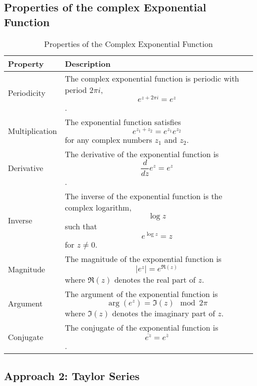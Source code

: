 \subsection*{Properties of the complex Exponential Function}
\begin{table}[htbp]
    \centering
    \begin{tabular}{| m{2.5cm} | m{11.5cm} |}
        \hline
        \textbf{Property} & \textbf{Description}                                                                                                                     \\
        \hline
        Periodicity       & The complex exponential function is periodic with period \( 2\pi i \), \[ e^{z + 2\pi i} = e^z \].                                       \\
        \hline
        Multiplication    & The exponential function satisfies \[ e^{z_1 + z_2} = e^{z_1} e^{z_2} \] for any complex numbers \( z_1 \) and \( z_2 \).                \\
        \hline
        Derivative        & The derivative of the exponential function is \[ \frac{d}{dz} e^z = e^z \].                                                              \\
        \hline
        Inverse           & The inverse of the exponential function is the complex logarithm, \[ \log z \] such that \[ e^{\log z} = z \] for \( z \neq 0 \).        \\
        \hline
        Magnitude         & The magnitude of the exponential function is \[ |e^z| = e^{\Re(z)} \] where \( \Re(z) \) denotes the real part of \( z \).               \\
        \hline
        Argument          & The argument of the exponential function is \[ \arg(e^z) = \Im(z) \mod 2\pi \] where \( \Im(z) \) denotes the imaginary part of \( z \). \\
        \hline
        Conjugate         & The conjugate of the exponential function is \[ \overline{e^z} = e^{\overline{z}} \].                                                    \\
        \hline
    \end{tabular}
    \caption{Properties of the Complex Exponential Function}
    \label{table:complex_exponential_properties}
\end{table}

\subsection*{Approach 2: Taylor Series}

